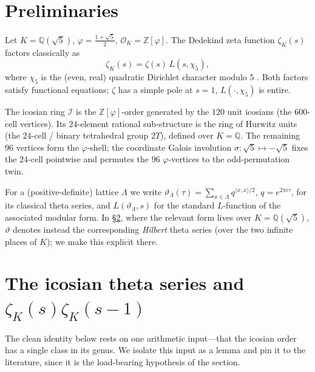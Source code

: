 \documentclass[11pt]{article}
\theoremstyle{definition}
\newcommand{\Z}{\mathbb{Z}}
\newcommand{\Q}{\mathbb{Q}}
\newcommand{\OK}{\mathcal{O}_K}
\newcommand{\zetaK}{\zeta_{K}}
\newcommand{\Icos}{\mathcal{I}}
\renewcommand{\Theta}{\vartheta}
\begin{document}
\section{Preliminaries}
Let $K=\Q(\sqrt5)$, $\varphi=\tfrac{1+\sqrt5}{2}$, $\OK=\Z[\varphi]$. The Dedekind
zeta function $\zetaK(s)$ factors classically as
\begin{equation}\label{eq:dedekind}
  \zetaK(s)=\zeta(s)\,L(s,\chi_5),
\end{equation}
where $\chi_5$ is the (even, real) quadratic Dirichlet character modulo $5$
\cite{Neukirch}. Both factors satisfy functional equations; $\zeta$ has a simple
pole at $s=1$, $L(\cdot,\chi_5)$ is entire.

The icosian ring $\Icos$ is the $\Z[\varphi]$-order generated by the $120$ unit
icosians (the $600$-cell vertices). Its $24$-element rational sub-structure is the
ring of Hurwitz units (the $24$-cell / binary tetrahedral group $2T$), defined over
$K=\Q$. The remaining $96$ vertices form the $\varphi$-shell; the coordinate Galois
involution $\sigma:\sqrt5\mapsto-\sqrt5$ fixes the $24$-cell pointwise and permutes
the $96$ $\varphi$-vertices to the odd-permutation twin.

For a (positive-definite) lattice $\Lambda$ we write $\Theta_\Lambda(\tau)=\sum_{x
\in\Lambda}q^{\langle x,x\rangle/2}$, $q=e^{2\pi i\tau}$, for its classical theta
series, and $L(\Theta_\Lambda,s)$ for the standard $L$-function of the associated
modular form. In \S\ref{sec:icosian}, where the relevant form lives over
$K=\Q(\sqrt5)$, $\Theta$ denotes instead the corresponding \emph{Hilbert} theta series
(over the two infinite places of $K$); we make this explicit there.

\section{The icosian theta series and \texorpdfstring{$\zetaK(s)\zetaK(s-1)$}{zetaK(s)zetaK(s-1)}}\label{sec:icosian}
The clean identity below rests on one arithmetic input---that the icosian order has a
single class in its genus. We isolate this input as a lemma and pin it to the
literature, since it is the load-bearing hypothesis of the section.
\end{document}
